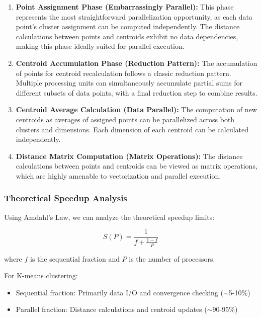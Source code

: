 \documentclass[12pt,a4paper]{article}
\begin{document}
\begin{enumerate}
\item \textbf{Point Assignment Phase (Embarrassingly Parallel):} This phase represents the most straightforward parallelization opportunity, as each data point's cluster assignment can be computed independently. The distance calculations between points and centroids exhibit no data dependencies, making this phase ideally suited for parallel execution.

\item \textbf{Centroid Accumulation Phase (Reduction Pattern):} The accumulation of points for centroid recalculation follows a classic reduction pattern. Multiple processing units can simultaneously accumulate partial sums for different subsets of data points, with a final reduction step to combine results.

\item \textbf{Centroid Average Calculation (Data Parallel):} The computation of new centroids as averages of assigned points can be parallelized across both clusters and dimensions. Each dimension of each centroid can be calculated independently.

\item \textbf{Distance Matrix Computation (Matrix Operations):} The distance calculations between points and centroids can be viewed as matrix operations, which are highly amenable to vectorization and parallel execution.
\end{enumerate}

\subsubsection{Theoretical Speedup Analysis}

Using Amdahl's Law, we can analyze the theoretical speedup limits:

\begin{equation}
S(P) = \frac{1}{f + \frac{1-f}{P}}
\end{equation}

where $f$ is the sequential fraction and $P$ is the number of processors.

For K-means clustering:
\begin{itemize}
\item Sequential fraction: Primarily data I/O and convergence checking ($\sim$5-10\%)
\item Parallel fraction: Distance calculations and centroid updates ($\sim$90-95\%)
\end{itemize}
\end{document}
